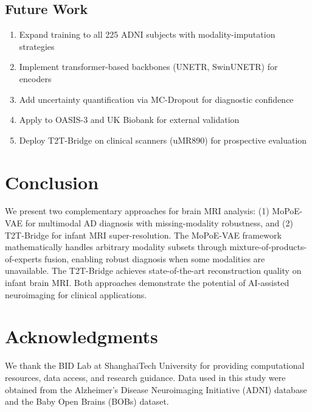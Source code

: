\documentclass[11pt,a4paper]{article}
\begin{document}
\subsection{Future Work}
\begin{enumerate}
    \item Expand training to all 225 ADNI subjects with modality-imputation strategies
    \item Implement transformer-based backbones (UNETR, SwinUNETR) for encoders
    \item Add uncertainty quantification via MC-Dropout for diagnostic confidence
    \item Apply to OASIS-3 and UK Biobank for external validation
    \item Deploy T2T-Bridge on clinical scanners (uMR890) for prospective evaluation
\end{enumerate}

\section{Conclusion}
We present two complementary approaches for brain MRI analysis: (1) MoPoE-VAE for multimodal AD diagnosis with missing-modality robustness, and (2) T2T-Bridge for infant MRI super-resolution. The MoPoE-VAE framework mathematically handles arbitrary modality subsets through mixture-of-products-of-experts fusion, enabling robust diagnosis when some modalities are unavailable. The T2T-Bridge achieves state-of-the-art reconstruction quality on infant brain MRI. Both approaches demonstrate the potential of AI-assisted neuroimaging for clinical applications.

\section{Acknowledgments}
We thank the BID Lab at ShanghaiTech University for providing computational resources, data access, and research guidance. Data used in this study were obtained from the Alzheimer's Disease Neuroimaging Initiative (ADNI) database and the Baby Open Brains (BOBs) dataset.
\end{document}
